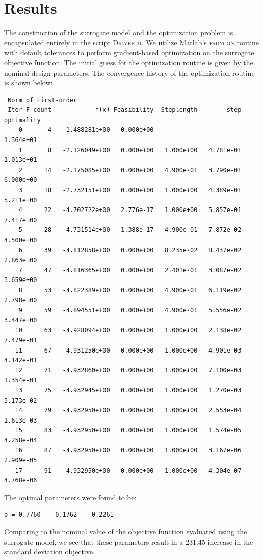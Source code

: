 \documentclass[11pt]{article}
\begin{document}
\section{Results}

The construction of the surrogate model and the optimization
problem is encapsulated entirely in the script \textsc{Driver.m}.
We utilize Matlab's \textsc{fmincon} routine with default tolerances
to perform gradient-based optimization on the surrogate objective
function. The initial guess for the optimization routine is given
by the nominal design parameters. The convergence history of the
optimization routine is shown below:

{ \scriptsize
\begin{verbatim}
 Norm of First-order
 Iter F-count            f(x) Feasibility  Steplength        step  optimality
    0       4   -1.488281e+00   0.000e+00                           1.364e+01
    1       8   -2.126049e+00   0.000e+00   1.000e+00   4.781e-01   1.013e+01
    2      14   -2.175085e+00   0.000e+00   4.900e-01   3.790e-01   6.000e+00
    3      18   -2.732151e+00   0.000e+00   1.000e+00   4.389e-01   5.211e+00
    4      22   -4.702722e+00   2.776e-17   1.000e+00   5.857e-01   7.417e+00
    5      28   -4.731514e+00   1.388e-17   4.900e-01   7.872e-02   4.500e+00
    6      39   -4.812858e+00   0.000e+00   8.235e-02   8.437e-02   2.863e+00
    7      47   -4.816365e+00   0.000e+00   2.401e-01   3.087e-02   3.659e+00
    8      53   -4.822389e+00   0.000e+00   4.900e-01   6.119e-02   2.798e+00
    9      59   -4.894551e+00   0.000e+00   4.900e-01   5.556e-02   3.447e+00
   10      63   -4.928094e+00   0.000e+00   1.000e+00   2.138e-02   7.479e-01
   11      67   -4.931250e+00   0.000e+00   1.000e+00   4.901e-03   4.142e-01
   12      71   -4.932860e+00   0.000e+00   1.000e+00   7.100e-03   1.354e-01
   13      75   -4.932945e+00   0.000e+00   1.000e+00   1.270e-03   3.173e-02
   14      79   -4.932950e+00   0.000e+00   1.000e+00   2.553e-04   1.613e-03
   15      83   -4.932950e+00   0.000e+00   1.000e+00   1.574e-05   4.258e-04
   16      87   -4.932950e+00   0.000e+00   1.000e+00   3.167e-06   2.909e-05
   17      91   -4.932950e+00   0.000e+00   1.000e+00   4.304e-07   4.768e-06
\end{verbatim} }

The optimal parameters were found to be:
{ \scriptsize
\begin{verbatim}
p = 0.7760    0.1762    0.2261
\end{verbatim} }
Comparing to the nominal value of the objective function evaluated
using the surrogate model, we see that these parameters
result in a $231.45$ increase in the standard deviation
objective.
\end{document}
